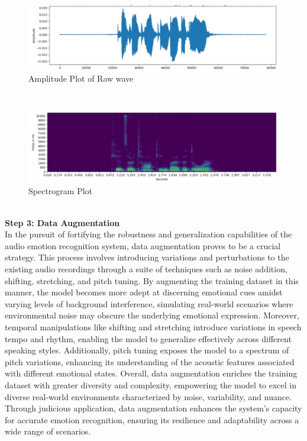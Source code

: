 \\
 \begin{figure}[hbt!]
  \centering
 \includegraphics[width=0.9\linewidth]{C_chap/fig33.png}
     \caption{Amplitude Plot of Raw wave}
\end{figure}
\\
 \begin{figure}[hbt!]
  \centering
 \includegraphics[width=0.9\linewidth]{C_chap/fig34.png}
     \caption{Spectrogram Plot}
\end{figure}
\\
\textbf{Step 3: Data Augmentation}
\\
In the pursuit of fortifying the robustness and generalization capabilities of the audio emotion recognition system, data augmentation proves to be a crucial strategy. This process involves introducing variations and perturbations to the existing audio recordings through a suite of techniques such as noise addition, shifting, stretching, and pitch tuning. By augmenting the training dataset in this manner, the model becomes more adept at discerning emotional cues amidst varying levels of background interference, simulating real-world scenarios where environmental noise may obscure the underlying emotional expression. Moreover, temporal manipulations like shifting and stretching introduce variations in speech tempo and rhythm, enabling the model to generalize effectively across different speaking styles. Additionally, pitch tuning exposes the model to a spectrum of pitch variations, enhancing its understanding of the acoustic features associated with different emotional states. Overall, data augmentation enriches the training dataset with greater diversity and complexity, empowering the model to excel in diverse real-world environments characterized by noise, variability, and nuance. Through judicious application, data augmentation enhances the system's capacity for accurate emotion recognition, ensuring its resilience and adaptability across a wide range of scenarios.

